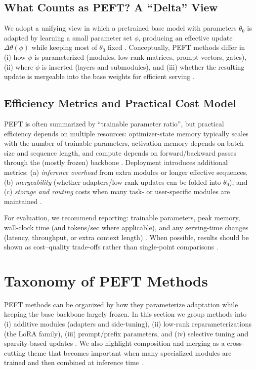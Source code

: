 \documentclass[conference]{IEEEtran}
\begin{document}
\subsection{What Counts as PEFT? A ``Delta'' View}
We adopt a unifying view in which a pretrained base model with parameters $\theta_0$ is adapted by learning a small parameter set $\phi$, producing an effective update $\Delta\theta(\phi)$ while keeping most of $\theta_0$ fixed \cite{he2021towards,han2024parameter}. Conceptually, PEFT methods differ in (i) how $\phi$ is parameterized (modules, low-rank matrices, prompt vectors, gates), (ii) where $\phi$ is inserted (layers and submodules), and (iii) whether the resulting update is mergeable into the base weights for efficient serving \cite{hu2021lora,houlsby2019parameter,li2021prefix}.

\subsection{Efficiency Metrics and Practical Cost Model}
PEFT is often summarized by ``trainable parameter ratio'', but practical efficiency depends on multiple resources: optimizer-state memory typically scales with the number of trainable parameters, activation memory depends on batch size and sequence length, and compute depends on forward/backward passes through the (mostly frozen) backbone \cite{dettmers2023qlora,han2024parameter}. Deployment introduces additional metrics: (a) \emph{inference overhead} from extra modules or longer effective sequences, (b) \emph{mergeability} (whether adapters/low-rank updates can be folded into $\theta_0$), and (c) \emph{storage and routing} costs when many task- or user-specific modules are maintained \cite{hu2021lora,pfeiffer2020adapterhub,yadav2023ties}.

For evaluation, we recommend reporting: trainable parameters, peak memory, wall-clock time (and tokens/sec where applicable), and any serving-time changes (latency, throughput, or extra context length) \cite{han2024parameter,wang2024parameter}. When possible, results should be shown as cost--quality trade-offs rather than single-point comparisons \cite{chen2023parameter,prottasha2025peft}.

\section{Taxonomy of PEFT Methods}
PEFT methods can be organized by how they parameterize adaptation while keeping the base backbone largely frozen. In this section we group methods into (i) additive modules (adapters and side-tuning), (ii) low-rank reparameterizations (the LoRA family), (iii) prompt/prefix parameters, and (iv) selective tuning and sparsity-based updates \cite{han2024parameter,wang2024parameter,prottasha2025peft}. We also highlight composition and merging as a cross-cutting theme that becomes important when many specialized modules are trained and then combined at inference time \cite{pfeiffer2020adapterfusion,yadav2023ties,gauthiercaron2024merging}.
\end{document}
